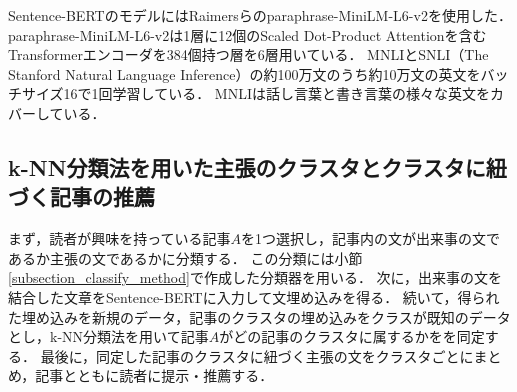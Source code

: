 \documentclass[12pt,a4j]{jreport}
\begin{document}
Sentence-BERTのモデルにはRaimersらのparaphrase-MiniLM-L6-v2を使用した\cite{reimers_sentence-bert_2019}．
paraphrase-MiniLM-L6-v2は1層に12個のScaled Dot-Product Attentionを含むTransformerエンコーダを384個持つ層を6層用いている．
MNLIとSNLI（The Stanford Natural Language Inference）の約100万文のうち約10万文の英文をバッチサイズ16で1回学習している．
MNLIは話し言葉と書き言葉の様々な英文をカバーしている．




\subsection{k-NN分類法を用いた主張のクラスタとクラスタに紐づく記事の推薦}
まず，読者が興味を持っている記事$A$を1つ選択し，記事内の文が出来事の文であるか主張の文であるかに分類する．
この分類には小節\ref{subsection_classify_method}で作成した分類器を用いる．
次に，出来事の文を結合した文章をSentence-BERTに入力して文埋め込みを得る．
続いて，得られた埋め込みを新規のデータ，記事のクラスタの埋め込みをクラスが既知のデータとし，k-NN分類法を用いて記事$A$がどの記事のクラスタに属するかをを同定する．
最後に，同定した記事のクラスタに紐づく主張の文をクラスタごとにまとめ，記事とともに読者に提示・推薦する．
\end{document}
